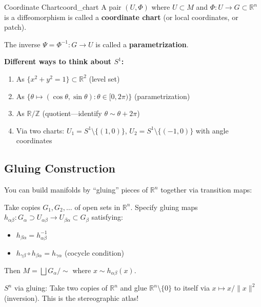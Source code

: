 \documentclass[11pt, letterpaper, openany]{book}
\begin{document}
\begin{defn}{Coordinate Chart}{coord_chart}
A pair $(U, \Phi)$ where $U \subset M$ and $\Phi: U \to G \subset \mathbb{R}^n$ is a diffeomorphism is called a \textbf{coordinate chart} (or local coordinates, or patch).

The inverse $\Psi = \Phi^{-1}: G \to U$ is called a \textbf{parametrization}.
\end{defn}

\begin{example}
\textbf{Different ways to think about $S^1$:}
\begin{enumerate}
    \item As $\{x^2 + y^2 = 1\} \subset \mathbb{R}^2$ (level set)
    \item As $\{\theta \mapsto (\cos\theta, \sin\theta) : \theta \in [0, 2\pi)\}$ (parametrization)
    \item As $\mathbb{R}/\mathbb{Z}$ (quotient---identify $\theta \sim \theta + 2\pi$)
    \item Via two charts: $U_1 = S^1 \setminus \{(1,0)\}$, $U_2 = S^1 \setminus \{(-1,0)\}$ with angle coordinates
\end{enumerate}
\end{example}

\subsection{Gluing Construction}

\begin{remark}
You can build manifolds by ``gluing'' pieces of $\mathbb{R}^n$ together via transition maps:

Take copies $G_1, G_2, \ldots$ of open sets in $\mathbb{R}^n$. Specify gluing maps $h_{\alpha\beta}: G_\alpha \supset U_{\alpha\beta} \to U_{\beta\alpha} \subset G_\beta$ satisfying:
\begin{itemize}
    \item $h_{\beta\alpha} = h_{\alpha\beta}^{-1}$
    \item $h_{\gamma\beta} \circ h_{\beta\alpha} = h_{\gamma\alpha}$ (cocycle condition)
\end{itemize}
Then $M = \bigsqcup G_\alpha / \sim$ where $x \sim h_{\alpha\beta}(x)$.
\end{remark}

\begin{example}
$S^n$ via gluing: Take two copies of $\mathbb{R}^n$ and glue $\mathbb{R}^n \setminus \{0\}$ to itself via $x \mapsto x/\|x\|^2$ (inversion). This is the stereographic atlas!
\end{example}
\end{document}
